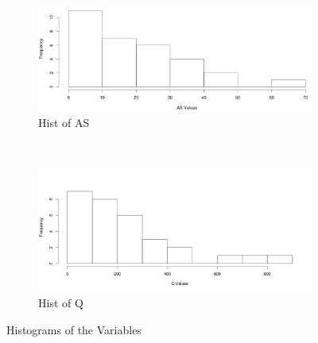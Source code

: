 \documentclass[a4paper,12pt, english]{article}
\begin{document}
\begin{figure}[H]
        \begin{subfigure}[b]{0.45\textwidth}
                \includegraphics[width=\textwidth]{as-hist}
                \caption{Hist of AS}
                \label{fig:as-hist}
        \end{subfigure}
        ~ %
        \begin{subfigure}[b]{0.45\textwidth}
                \includegraphics[width=\textwidth]{q-hist}
                \caption{Hist of Q}
                \label{fig:q-hist}
        \end{subfigure}
        \caption{Histograms of the Variables}
        \label{fig:histograms}
\end{figure}
\end{document}
